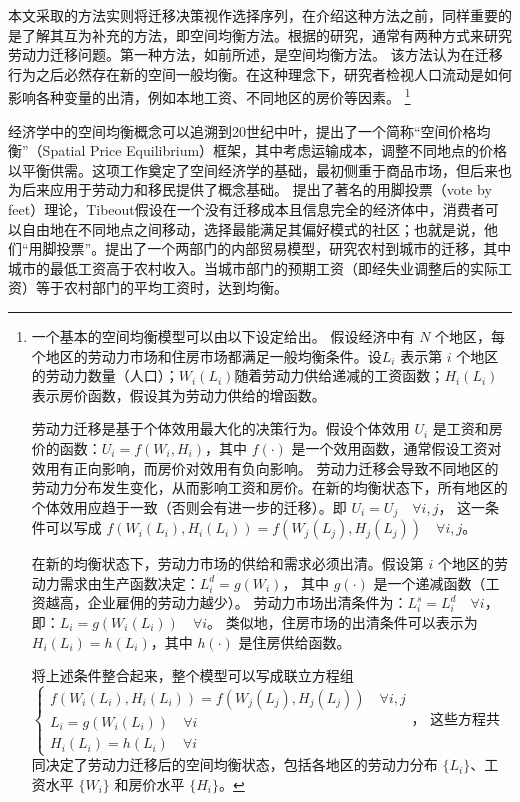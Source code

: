 \documentclass[a4paper, zihao=-4, fontset = mac, oneside]{ctexbook} %
\let\oldfootnote\footnote
\renewcommand{\footnote}[1]{%
  \oldfootnote{\setstretch{1.5}#1}%
}
\begin{document}
本文采取的方法实则将迁移决策视作选择序列，在介绍这种方法之前，同样重要的是了解其互为补充的方法，即空间均衡方法。根据\textcite{jiaEconomicsInternalMigration2023}的研究，通常有两种方式来研究劳动力迁移问题。第一种方法，如前所述，是空间均衡方法。
该方法认为在迁移行为之后必然存在新的空间一般均衡。在这种理念下，研究者检视人口流动是如何影响各种变量的出清，例如本地工资、不同地区的房价等因素。
\footnote{
一个基本的空间均衡模型可以由以下设定给出。
假设经济中有 $N$ 个地区，每个地区的劳动力市场和住房市场都满足一般均衡条件。设$ L_i $ 表示第 $ i $ 个地区的劳动力数量（人口）；$ W_i(L_i) $随着劳动力供给递减的工资函数；$ H_i(L_i) $ 表示房价函数，假设其为劳动力供给的增函数。

劳动力迁移是基于个体效用最大化的决策行为。假设个体效用 $ U_i $ 是工资和房价的函数：$U_i = f(W_i, H_i)$，其中 $ f(\cdot) $ 是一个效用函数，通常假设工资对效用有正向影响，而房价对效用有负向影响。
劳动力迁移会导致不同地区的劳动力分布发生变化，从而影响工资和房价。在新的均衡状态下，所有地区的个体效用应趋于一致（否则会有进一步的迁移）。即
$U_i = U_j \quad \forall i, j$，
这一条件可以写成
$f(W_i(L_i), H_i(L_i)) = f(W_j(L_j), H_j(L_j)) \quad \forall i, j$。

在新的均衡状态下，劳动力市场的供给和需求必须出清。假设第 $ i $ 个地区的劳动力需求由生产函数决定：$L_i^d = g(W_i)$，
其中 $ g(\cdot) $ 是一个递减函数（工资越高，企业雇佣的劳动力越少）。
劳动力市场出清条件为：$L_i^s = L_i^d \quad \forall i$，即：$L_i = g(W_i(L_i)) \quad \forall i$。
类似地，住房市场的出清条件可以表示为$H_i(L_i) = h(L_i)$，其中 $ h(\cdot) $ 是住房供给函数。

将上述条件整合起来，整个模型可以写成联立方程组
$\begin{cases}
f(W_i(L_i), H_i(L_i)) = f(W_j(L_j), H_j(L_j)) \quad \forall i, j \\
L_i = g(W_i(L_i)) \quad \forall i \\
H_i(L_i) = h(L_i) \quad \forall i
\end{cases}$，
这些方程共同决定了劳动力迁移后的空间均衡状态，包括各地区的劳动力分布 $ \{L_i\} $、工资水平 $ \{W_i\} $ 和房价水平 $ \{H_i\} $。
}

经济学中的空间均衡概念可以追溯到20世纪中叶，\textcite{samuelsonSpatialPriceEquilibrium1952}提出了一个简称“空间价格均衡”（Spatial Price Equilibrium）框架，其中考虑运输成本，调整不同地点的价格以平衡供需。这项工作奠定了空间经济学的基础，最初侧重于商品市场，但后来也为后来应用于劳动力和移民提供了概念基础。
\textcite{tieboutPureTheoryLocal1956}提出了著名的用脚投票（vote by feet）理论，Tibeout假设在一个没有迁移成本且信息完全的经济体中，消费者可以自由地在不同地点之间移动，选择最能满足其偏好模式的社区；也就是说，他们“用脚投票”。\textcite{harrisMigrationUnemploymentDevelopment1970}提出了一个两部门的内部贸易模型，研究农村到城市的迁移，其中城市的最低工资高于农村收入。当城市部门的预期工资（即经失业调整后的实际工资）等于农村部门的平均工资时，达到均衡。
\end{document}
